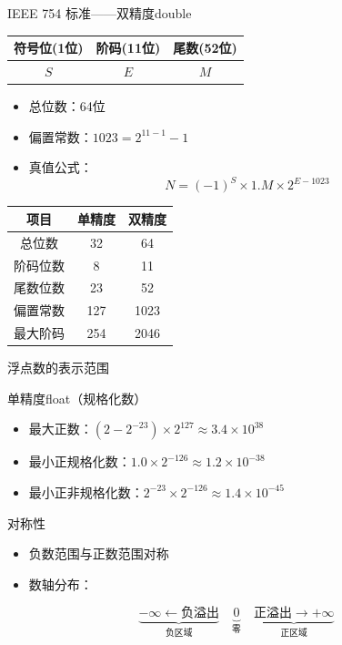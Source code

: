 \documentclass[10pt, aspectratio=169]{beamer}
\begin{document}
\begin{frame}{IEEE 754 标准——双精度double}
    \begin{center}
        \begin{tabular}{|c|c|c|}
            \hline
            符号位(1位) & 阶码(11位) & 尾数(52位) \\
            \hline
            $S$ & $E$ & $M$ \\
            \hline
        \end{tabular}
    \end{center}
    \vspace{0.5em}
    \begin{itemize}
        \item 总位数：64位
        \item 偏置常数：$1023 = 2^{11-1} - 1$
        \item 真值公式：
        \[
            N = (-1)^S \times 1.M \times 2^{E-1023}
        \]
    \end{itemize}
    \vspace{0.3em}
    \begin{tabular}{|c|c|c|}
        \hline
        \textbf{项目} & \textbf{单精度} & \textbf{双精度} \\
        \hline
        总位数 & 32 & 64 \\
        \hline
        阶码位数 & 8 & 11 \\
        \hline
        尾数位数 & 23 & 52 \\
        \hline
        偏置常数 & 127 & 1023 \\
        \hline
        最大阶码 & 254 & 2046 \\
        \hline
    \end{tabular}
\end{frame}

\begin{frame}[t]{浮点数的表示范围}
    \begin{block}{单精度float（规格化数）}
        \begin{itemize}
            \item 最大正数：$(2 - 2^{-23}) \times 2^{127} \approx 3.4 \times 10^{38}$
            \item 最小正规格化数：$1.0 \times 2^{-126} \approx 1.2 \times 10^{-38}$
            \item 最小正非规格化数：$2^{-23} \times 2^{-126} \approx 1.4 \times 10^{-45}$
        \end{itemize}
    \end{block}
    \begin{block}{对称性}
        \begin{itemize}
            \item 负数范围与正数范围对称
            \item 数轴分布：
        \end{itemize}
        \[
            \underbrace{-\infty \leftarrow \text{负溢出}}_{\text{负区域}} \quad
            \underbrace{0}_{\text{零}} \quad
            \underbrace{\text{正溢出} \rightarrow +\infty}_{\text{正区域}}
        \]
    \end{block}
\end{frame}
\end{document}
